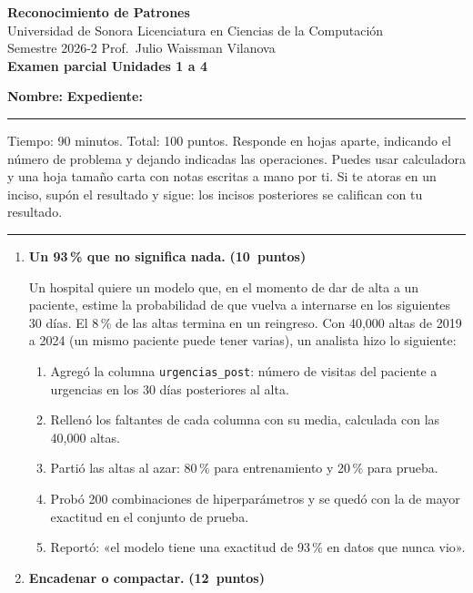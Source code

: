 \documentclass[11pt]{article}
\newcommand{\pts}[1]{\hfill\textbf{(#1~puntos)}}
\newcommand{\ptsinc}[1]{{\unskip\nobreak\hfil\penalty50\hskip1em\hbox{}\nobreak\hfill(#1)\parfillskip=0pt\finalhyphendemerits=0\par}}
\newcommand{\encabezado}[2]{%
\begin{center}
{\large\bfseries Reconocimiento de Patrones}\\[2pt]
Universidad de Sonora \textperiodcentered{} Licenciatura en Ciencias de la Computación\\
Semestre 2026-2 \textperiodcentered{} Prof.\ Julio Waissman Vilanova\\[10pt]
{\Large\bfseries #1}%
\ifdefined\tipodoc\\[4pt]{\large\itshape\tipodoc}\fi
\end{center}
\ifdefined\tipodoc\else
\vspace{6pt}
\textbf{Nombre:} \hrulefill\quad \textbf{Expediente:} \rule{3.5cm}{0.4pt}\par
\vspace{6pt}
\fi
#2
\par\medskip\hrule\medskip
}
\begin{document}
\encabezado{Examen parcial \textperiodcentered{} Unidades 1 a 4}{%
Tiempo: 90 minutos. Total: 100 puntos. Responde en hojas aparte, indicando el número de problema y dejando indicadas las operaciones. Puedes usar calculadora y una hoja tamaño carta con notas escritas a mano por ti. Si te atoras en un inciso, supón el resultado y sigue: los incisos posteriores se califican con tu resultado.}

\begin{enumerate}

\item \textbf{Un 93\,\% que no significa nada.} \pts{10}

Un hospital quiere un modelo que, en el momento de dar de alta a un paciente, estime la probabilidad de que vuelva a internarse en los siguientes 30 días. El 8\,\% de las altas termina en un reingreso. Con 40,000 altas de 2019 a 2024 (un mismo paciente puede tener varias), un analista hizo lo siguiente:
\begin{enumerate}[label=\arabic*), itemsep=1pt]
  \item Agregó la columna \texttt{urgencias\_post}: número de visitas del paciente a urgencias en los 30 días posteriores al alta.
  \item Rellenó los faltantes de cada columna con su media, calculada con las 40,000 altas.
  \item Partió las altas al azar: 80\,\% para entrenamiento y 20\,\% para prueba.
  \item Probó 200 combinaciones de hiperparámetros y se quedó con la de mayor exactitud en el conjunto de prueba.
  \item Reportó: «el modelo tiene una exactitud de 93\,\% en datos que nunca vio».
\end{enumerate}


\item \textbf{Encadenar o compactar.} \pts{12}


\end{enumerate}
\end{document}
